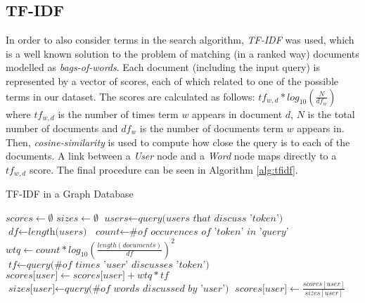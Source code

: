 \subsection{TF-IDF}


In order to also consider terms in the search algorithm, \emph{TF-IDF} was used, 
which is a well known solution to the problem of matching (in a ranked
way) documents modelled as \emph{bags-of-words}. Each document (including the
input query) is represented by a vector of scores, each of which related to one
of the possible terms in our dataset. The scores are calculated as follows:
${tf}_{w, d} * log_{10}(\frac{N}{{df}_{w}})$ where ${tf}_{w, d}$ is the number
of times term $w$ appears in document $d$, $N$ is the total number of documents
and ${df}_{w}$ is the number of documents term $w$ appears in. Then,
\emph{cosine-similarity} is used to compute how close the query is to each of
the documents. A link between a \emph{User} node and a \emph{Word} node maps
directly to a ${tf}_{w,d}$ score. The final procedure can be seen in Algorithm \ref{alg:tfidf}.


\begin{algorithm}
\caption{TF-IDF in a Graph Database}\label{alg:tfidf}
\begin{algorithmic}[1]
    \State $\textit{scores} \gets \emptyset$
    \State $\textit{sizes} \gets \emptyset$
        \State $\textit{users} \gets \textit{query(users that discuss 'token')}$
        \State $\textit{df} \gets \textit{length(users)}$
        \State $\textit{count} \gets \textit{\# of occurences of 'token' in 'query'}$
        \State $\textit{wtq} \gets \textit{$count * log_{10}(\frac{length(documents)}{df})^2$}$
        \State $\textit{tf} \gets \textit{query(\# of times 'user' discusses 'token')}$
          \State $\textit{scores[user]} \gets \textit{scores[user]} + wtq*tf$
          \State $\textit{sizes[user]} \gets \textit{query(\# of words discussed by 'user')}$
        \EndFor
    \EndFor
        \State $\textit{scores[user]} \gets \textit{$\frac{scores[user]}{sizes[user]}$}$
    \EndFor
    \State {}
\EndProcedure
\end{algorithmic}
\end{algorithm}

